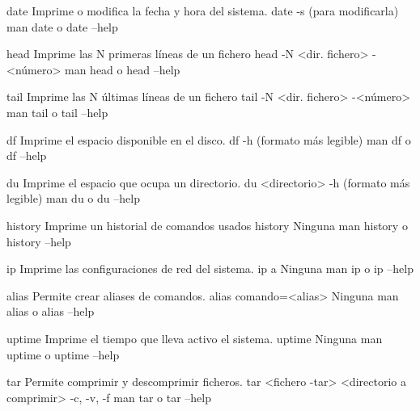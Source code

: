 \begin{command-info}
{date}
{Imprime o modifica la fecha y hora del sistema.}
{date}
{-s (para modificarla)}
{man date o date --help}
\end{command-info}

\begin{command-info}
{head}
{Imprime las N primeras líneas de un fichero}
{head -N <dir. fichero>}
{-<número>}
{man head o head --help}
\end{command-info}

\begin{command-info}
{tail}
{Imprime las N últimas líneas de un fichero}
{tail -N <dir. fichero>}
{-<número>}
{man tail o tail --help}
\end{command-info}

\begin{command-info}
{df}
{Imprime el espacio disponible en el disco.}
{df}
{-h (formato más legible)}
{man df o df --help}
\end{command-info}

\begin{command-info}
{du}
{Imprime el espacio que ocupa un directorio.}
{du <directorio>}
{-h (formato más legible)}
{man du o du --help}
\end{command-info}

\begin{command-info}
{history}
{Imprime un historial de comandos usados}
{history}
{Ninguna}
{man history o history --help}
\end{command-info}

\begin{command-info}
{ip}
{Imprime las configuraciones de red del sistema.}
{ip a}
{Ninguna}
{man ip o ip --help}
\end{command-info}

\begin{command-info}
{alias}
{Permite crear aliases de comandos.}
{alias comando=<alias>}
{Ninguna}
{man alias o alias --help}
\end{command-info}

\begin{command-info}
{uptime}
{Imprime el tiempo que lleva activo el sistema.}
{uptime}
{Ninguna}
{man uptime o uptime --help}
\end{command-info}

\begin{command-info}
{tar}
{Permite comprimir y descomprimir ficheros.}
{tar <fichero -tar> <directorio a comprimir>}
{-c, -v, -f}
{man tar o tar --help}
\end{command-info}

